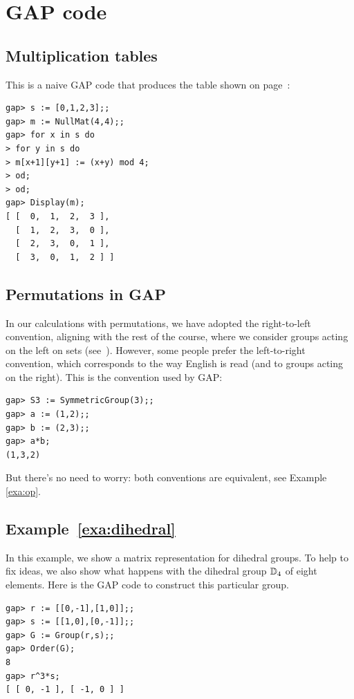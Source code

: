 \section*{GAP code}

\subsection*{Multiplication tables}

This is a naive GAP code that produces the table
shown on page~\pageref{multiplication_table}:
\begin{lstlisting}
gap> s := [0,1,2,3];;
gap> m := NullMat(4,4);;
gap> for x in s do
> for y in s do
> m[x+1][y+1] := (x+y) mod 4;
> od;
> od;
gap> Display(m);
[ [  0,  1,  2,  3 ],
  [  1,  2,  3,  0 ],
  [  2,  3,  0,  1 ],
  [  3,  0,  1,  2 ] ]
\end{lstlisting}


\subsection*{Permutations in GAP}

In our calculations with permutations, we have adopted the right-to-left
convention, aligning with the rest of the course, where we consider groups
acting on the left on sets (see~\pageref{convention:right-to-left}).  However,
some people prefer the left-to-right convention, which corresponds to the way
English is read (and to groups acting on the right). This is the convention
used by GAP:
\begin{lstlisting}
gap> S3 := SymmetricGroup(3);;
gap> a := (1,2);;
gap> b := (2,3);;
gap> a*b;
(1,3,2)
\end{lstlisting}
But there's no need to worry: both conventions are equivalent, see Example \ref{exa:op}.

\subsection*{Example~\ref{exa:dihedral}}

In this example, we show a matrix representation
for dihedral groups. To help to fix ideas,
we also show what happens with the dihedral group
$\mathbb{D}_4$ of eight elements. Here is the GAP
code to construct this particular group.
\begin{lstlisting}
gap> r := [[0,-1],[1,0]];;
gap> s := [[1,0],[0,-1]];;
gap> G := Group(r,s);;
gap> Order(G);
8
gap> r^3*s;
[ [ 0, -1 ], [ -1, 0 ] ]
\end{lstlisting}



